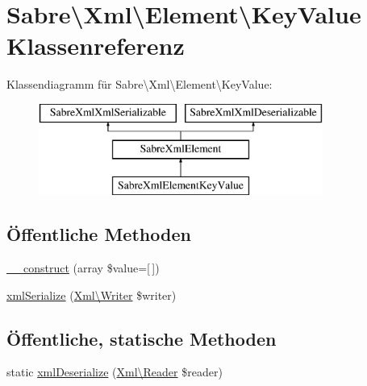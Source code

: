 \hypertarget{class_sabre_1_1_xml_1_1_element_1_1_key_value}{}\section{Sabre\textbackslash{}Xml\textbackslash{}Element\textbackslash{}Key\+Value Klassenreferenz}
\label{class_sabre_1_1_xml_1_1_element_1_1_key_value}
Klassendiagramm für Sabre\textbackslash{}Xml\textbackslash{}Element\textbackslash{}Key\+Value\+:\begin{figure}[H]
\begin{center}
\leavevmode
\includegraphics[height=3.000000cm]{class_sabre_1_1_xml_1_1_element_1_1_key_value}
\end{center}
\end{figure}
\subsection*{Öffentliche Methoden}
\begin{DoxyCompactItemize}
\item 
\mbox{\hyperlink{class_sabre_1_1_xml_1_1_element_1_1_key_value_af4bb1d6d1ddaad7ecd984b6189e2ec3a}{\+\_\+\+\_\+construct}} (array \$value=\mbox{[}$\,$\mbox{]})
\item 
\mbox{\hyperlink{class_sabre_1_1_xml_1_1_element_1_1_key_value_acf981021984192a42aa9acb3e36b3a07}{xml\+Serialize}} (\mbox{\hyperlink{class_sabre_1_1_xml_1_1_writer}{Xml\textbackslash{}\+Writer}} \$writer)
\end{DoxyCompactItemize}
\subsection*{Öffentliche, statische Methoden}
\begin{DoxyCompactItemize}
\item 
static \mbox{\hyperlink{class_sabre_1_1_xml_1_1_element_1_1_key_value_a483e9bfde32985dd2d82c45d6760ae31}{xml\+Deserialize}} (\mbox{\hyperlink{class_sabre_1_1_xml_1_1_reader}{Xml\textbackslash{}\+Reader}} \$reader)
\end{DoxyCompactItemize}
